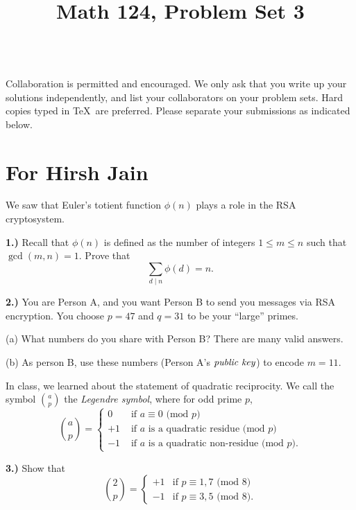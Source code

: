 \documentclass[10pt]{amsart}
\title{Math 124, Problem Set 3}
\begin{document}
\maketitle

\\
 Collaboration is permitted and encouraged. We only ask that you write up your solutions independently, and list your collaborators on your problem sets. Hard copies typed in \TeX\  are preferred. Please separate your submissions as indicated below.

\section*{For Hirsh Jain}

\noindent We saw that Euler's totient function $\phi(n)$ plays a role in the RSA cryptosystem.

\medskip

{\bf 1.)} Recall that $\phi(n)$ is defined as the number of integers $1 \le m \le n$ such that $\gcd(m,n) = 1$. Prove that
\[
\sum_{d\mid n} \phi(d) = n.
\]

\medskip

{\bf 2.)} You are Person A, and you want Person B to send you messages via RSA encryption. You choose $p = 47$ and $q = 31$ to be your ``large'' primes.

\smallskip

(a) What numbers do you share with Person B? There are many valid answers.

\smallskip

(b) As person B, use these numbers (Person A's $\emph{public key}$) to encode $m = 11$.

\medskip

\noindent In class, we learned about the statement of quadratic reciprocity. We call the symbol $a \choose p$ the \emph{Legendre symbol}, where for odd prime $p$,
\[
{a \choose p} = \begin{cases} 0 & \text{ if $a \equiv 0$ (mod $p$)} \\ +1 & \text{ if $a$ is a quadratic residue (mod $p$)} \\ -1 & \text{ if $a$ is a quadratic non-residue (mod $p$).} \end{cases}
\]

\medskip

{\bf 3.)} Show that
\[
{2 \choose p} = \begin{cases}
+1 & \text{if } p \equiv 1, 7 \text{ (mod $8$)}\\
-1 & \text{if } p \equiv 3, 5 \text{ (mod $8$)}.
\end{cases}
\]
\end{document}
